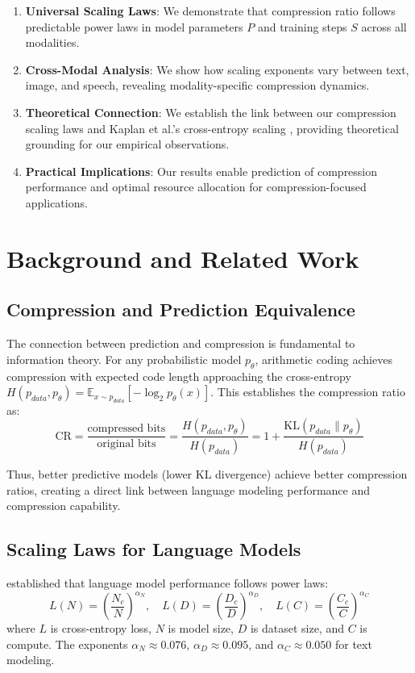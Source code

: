 \documentclass[11pt]{article}
\begin{document}
\begin{enumerate}
\item \textbf{Universal Scaling Laws}: We demonstrate that compression ratio follows predictable power laws in model parameters $P$ and training steps $S$ across all modalities.
\item \textbf{Cross-Modal Analysis}: We show how scaling exponents vary between text, image, and speech, revealing modality-specific compression dynamics.
\item \textbf{Theoretical Connection}: We establish the link between our compression scaling laws and Kaplan et al.'s cross-entropy scaling \citep{kaplan2020scaling}, providing theoretical grounding for our empirical observations.
\item \textbf{Practical Implications}: Our results enable prediction of compression performance and optimal resource allocation for compression-focused applications.
\end{enumerate}

\section{Background and Related Work}

\subsection{Compression and Prediction Equivalence}

The connection between prediction and compression is fundamental to information theory. For any probabilistic model $p_\theta$, arithmetic coding achieves compression with expected code length approaching the cross-entropy $H(p_{data}, p_\theta) = \mathbb{E}_{x \sim p_{data}}[-\log_2 p_\theta(x)]$. This establishes the compression ratio as:
\[
\mathrm{CR} = \frac{\text{compressed bits}}{\text{original bits}} = \frac{H(p_{data}, p_\theta)}{H(p_{data})} = 1 + \frac{\mathrm{KL}(p_{data} \parallel p_\theta)}{H(p_{data})}
\]

Thus, better predictive models (lower KL divergence) achieve better compression ratios, creating a direct link between language modeling performance and compression capability.

\subsection{Scaling Laws for Language Models}

\citet{kaplan2020scaling} established that language model performance follows power laws:
\[
L(N) = \left(\frac{N_c}{N}\right)^{\alpha_N}, \quad L(D) = \left(\frac{D_c}{D}\right)^{\alpha_D}, \quad L(C) = \left(\frac{C_c}{C}\right)^{\alpha_C}
\]
where $L$ is cross-entropy loss, $N$ is model size, $D$ is dataset size, and $C$ is compute. The exponents $\alpha_N \approx 0.076$, $\alpha_D \approx 0.095$, and $\alpha_C \approx 0.050$ for text modeling.
\end{document}
